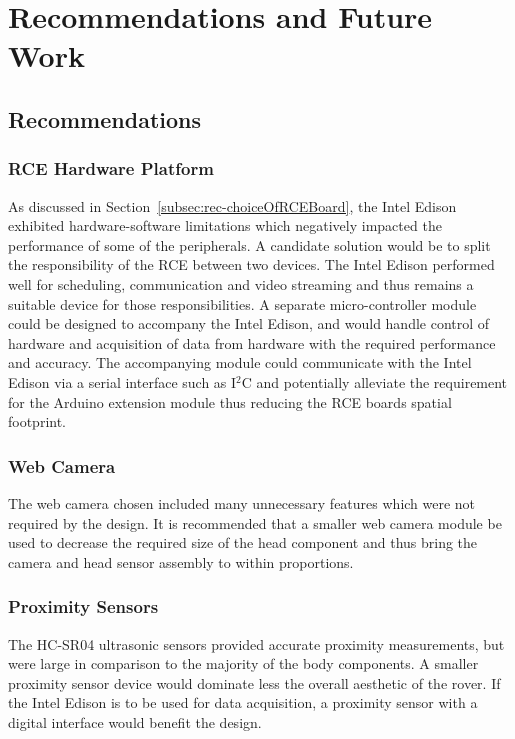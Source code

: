 \chapter{Recommendations and Future Work}
  \section{Recommendations}
    \subsection{RCE Hardware Platform}
      As discussed in Section~\ref{subsec:rec-choiceOfRCEBoard}, the Intel Edison exhibited hardware-software limitations which negatively impacted the performance of some of the peripherals. A candidate solution would be to split the responsibility of the RCE between two devices. The Intel Edison performed well for scheduling, communication and video streaming and thus remains a suitable device for those responsibilities. A separate micro-controller module could be designed to accompany the Intel Edison, and would handle control of hardware and acquisition of data from hardware with the required performance and accuracy. The accompanying module could communicate with the Intel Edison via a serial interface such as I$^2$C and potentially alleviate the requirement for the Arduino extension module thus reducing the RCE boards spatial footprint.
      
    \subsection{Web Camera}
      The web camera chosen included many unnecessary features which were not required by the design. It is recommended that a smaller web camera module be used to decrease the required size of the head component and thus bring the camera and head sensor assembly to within proportions.
      
    \subsection{Proximity Sensors}
      The HC-SR04 ultrasonic sensors provided accurate proximity measurements, but were large in comparison to the majority of the body components. A smaller proximity sensor device would dominate less the overall aesthetic of the rover. If the Intel Edison is to be used for data acquisition, a proximity sensor with a digital interface would benefit the design.
      
